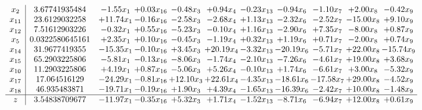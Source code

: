 \documentclass[9pt]{article}
\begin{document}
\[\begin{array}{c| c c@{\hskip 2pt} c@{\hskip 2pt} c@{\hskip 2pt} c@{\hskip 2pt} c@{\hskip 2pt} c@{\hskip 2pt} c@{\hskip 2pt} c@{\hskip 2pt} c@{\hskip 2pt} }
 x_{2}   &  3.67741935484 & -1.55 x_{1} & +  0.03 x_{16} & -0.48 x_{3} & +  0.94 x_{4} & -0.23 x_{13} & -0.94 x_{6} & -1.10 x_{7} & +  2.00 x_{8} & -0.42 x_{9}\\
 x_{11}   &  23.6129032258 & + 11.74 x_{1} & -0.16 x_{16} & -2.58 x_{3} & -2.68 x_{4} & +  1.13 x_{13} & -2.32 x_{6} & -2.52 x_{7} & -15.00 x_{8} & +  9.10 x_{9}\\
 x_{12}   &  7.51612903226 & -0.32 x_{1} & +  0.55 x_{16} & -5.23 x_{3} & -0.10 x_{4} & +  1.16 x_{13} & -2.90 x_{6} & +  7.35 x_{7} & -8.00 x_{8} & +  0.87 x_{9}\\
 x_{5}   &  0.0322580645161 & +  2.35 x_{1} & +  0.10 x_{16} & -0.45 x_{3} & -1.19 x_{4} & +  0.32 x_{13} & +  1.19 x_{6} & +  0.71 x_{7} & -2.00 x_{8} & +  0.74 x_{9}\\
 x_{14}   &  31.9677419355 & -15.35 x_{1} & -0.10 x_{16} & +  3.45 x_{3} & + 20.19 x_{4} & -3.32 x_{13} & -20.19 x_{6} & -5.71 x_{7} & + 22.00 x_{8} & -15.74 x_{9}\\
 x_{15}   &  65.2903225806 & -5.81 x_{1} & -0.13 x_{16} & -8.06 x_{3} & -1.74 x_{4} & -2.10 x_{13} & -7.26 x_{6} & -4.61 x_{7} & + 19.00 x_{8} & +  3.68 x_{9}\\
 x_{10}   &  11.2903225806 & +  4.19 x_{1} & +  0.87 x_{16} & -5.06 x_{3} & +  5.26 x_{4} & -0.10 x_{13} & +  1.74 x_{6} & -6.61 x_{7} & +  3.00 x_{8} & -5.32 x_{9}\\
 x_{17}   &  17.064516129 & -24.29 x_{1} & -0.81 x_{16} & + 12.10 x_{3} & + 22.61 x_{4} & -4.35 x_{13} & -18.61 x_{6} & -17.58 x_{7} & + 29.00 x_{8} & -4.52 x_{9}\\
 x_{18}   &  46.935483871 & -19.71 x_{1} & -0.19 x_{16} & +  1.90 x_{3} & +  4.39 x_{4} & -1.65 x_{13} & -16.39 x_{6} & -2.42 x_{7} & + 10.00 x_{8} & -1.48 x_{9}\\
\hline
z    &  3.54838709677 & -11.97 x_{1} & -0.35 x_{16} & +  5.32 x_{3} & +  1.71 x_{4} & -1.52 x_{13} & -8.71 x_{6} & -6.94 x_{7} & + 12.00 x_{8} & +  0.61 x_{9}\\
\end{array}\]
\end{document}
